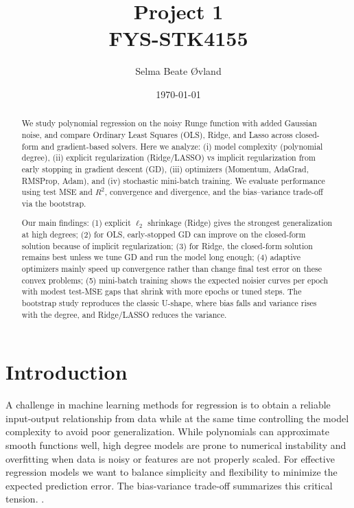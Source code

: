 \documentclass[amssymb,twocolumn,aps]{revtex4-2}
\begin{document}
	
\title{Project 1 \\
    \normalsize FYS-STK4155}
\date{\today}               
\author{Selma Beate Øvland}

\newpage
	
\begin{abstract}

We study polynomial regression on the noisy Runge function with added Gaussian noise, and compare Ordinary Least Squares (OLS), Ridge, and Lasso across closed-form and gradient-based solvers. Here we analyze: (i) model complexity (polynomial degree), (ii) explicit regularization (Ridge/LASSO) vs implicit regularization from early stopping in gradient descent (GD), (iii) optimizers (Momentum, AdaGrad, RMSProp, Adam), and (iv) stochastic mini-batch training. We evaluate performance using test MSE and $R^2$, convergence and divergence, and the bias–variance trade-off via the bootstrap. 

Our main findings: (1) explicit $\ell_2$ shrinkage (Ridge) gives the strongest generalization at high degrees; (2) for OLS, early-stopped GD can improve on the closed-form solution because of implicit regularization; (3) for Ridge, the closed-form solution remains best unless we tune GD and run the model long enough; (4) adaptive optimizers mainly speed up convergence rather than change final test error on these convex problems; (5) mini-batch training shows the expected noisier curves per epoch with modest test-MSE gaps that shrink with more epochs or tuned steps. The bootstrap study reproduces the classic U-shape, where bias falls and variance rises with the degree, and Ridge/LASSO reduces the variance.

\end{abstract}


\maketitle

\section{Introduction}
A challenge in machine learning methods for regression is to obtain a reliable input-output relationship from data while at the same time controlling the model complexity to avoid poor generalization. While polynomials can approximate smooth functions well, high degree models are prone to numerical instability and overfitting when data is noisy or features are not properly scaled. For effective regression models we want to balance simplicity and flexibility to minimize the expected prediction error. The bias-variance trade-off summarizes this critical tension. \cite{compfys39}. \\
\end{document}
